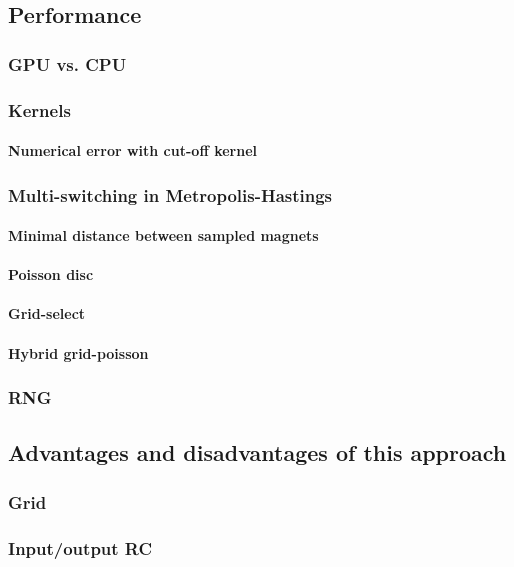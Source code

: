 \subsection{Performance} %
\subsubsection{GPU vs. CPU}
\subsubsection{Kernels} %
\paragraph{Numerical error with cut-off kernel}
\subsubsection{Multi-switching in Metropolis-Hastings}
\paragraph{Minimal distance between sampled magnets} %
\paragraph{Poisson disc}
\paragraph{Grid-select}
\paragraph{Hybrid grid-poisson}
\subsubsection{RNG} %
\subsection{Advantages and disadvantages of this approach} %
\subsubsection{Grid}
\subsubsection{Input/output RC}

